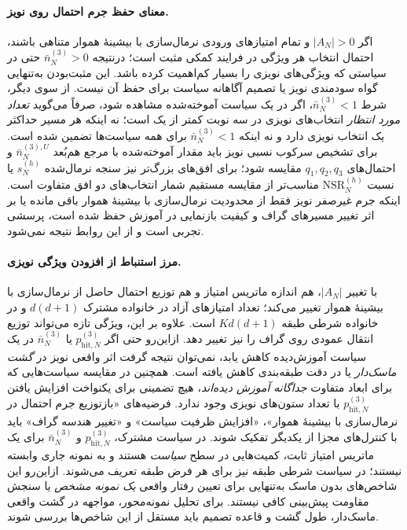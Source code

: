 \paragraph{معنای حفظ جرم احتمال روی نویز.}
اگر $|A_N|>0$ و تمام امتیازهای ورودی نرمال‌سازی با بیشینهٔ هموار متناهی باشند،
احتمال انتخاب هر ویژگی در فرایند کمکی مثبت است؛
درنتیجه $\bar n_N^{(3)}>0$ حتی در سیاستی که
ویژگی‌های نویزی را بسیار کم‌اهمیت کرده باشد.
این مثبت‌بودن به‌تنهایی گواه سودمندی نویز
یا تصمیم آگاهانه سیاست برای حفظ آن نیست.
از سوی دیگر، شرط $\bar n_N^{(3)}<1$، اگر در یک سیاست
آموخته‌شده مشاهده شود، صرفاً می‌گوید
\emph{تعداد مورد انتظار} انتخاب‌های نویزی
در سه نوبت کمتر از یک است؛
نه اینکه هر مسیر حداکثر یک انتخاب نویزی دارد
و نه اینکه $\bar n_N^{(3)}<1$ برای همه سیاست‌ها تضمین شده است.
برای تشخیص سرکوب نسبی نویز باید مقدار آموخته‌شده
با مرجع هم‌بُعد $\bar n_N^{(3),U}$ و احتمال‌های
$q_1,q_2,q_3$ مقایسه شود؛ برای افق‌های
بزرگ‌تر نیز سنجه نرمال‌شده
$s_N^{(h)}$ یا نسبت
$\mathrm{NSR}_N^{(h)}$
مناسب‌تر از مقایسه مستقیم
شمار انتخاب‌های دو افق متفاوت است.
اینکه جرم غیرصفر نویز فقط از محدودیت نرمال‌سازی با بیشینهٔ هموار
باقی مانده یا بر اثر تغییر مسیرهای گراف
و کیفیت بازنمایی در آموزش حفظ شده است،
پرسشی تجربی است و از این روابط نتیجه نمی‌شود.

\paragraph{مرز استنباط از افزودن ویژگی نویزی.}
با تغییر $|A_N|$، هم اندازه ماتریس امتیاز
و هم توزیع احتمال حاصل از نرمال‌سازی با بیشینهٔ هموار تغییر می‌کند؛
تعداد امتیازهای آزاد در خانواده مشترک $d(d+1)$
و در خانواده شرطی طبقه $Kd(d+1)$ است.
علاوه بر این، ویژگی تازه می‌تواند توزیع انتقال عمودی
روی گراف را نیز تغییر دهد. ازاین‌رو حتی اگر
$p_{\mathrm{hit},N}^{(3)}$ یا
$\bar n_N^{(3)}$ در یک سیاست آموزش‌دیده کاهش یابد،
نمی‌توان نتیجه گرفت اثر واقعی نویز در
\emph{گشت ماسک‌دار} یا در دقت طبقه‌بندی کاهش یافته است.
همچنین در مقایسه سیاست‌هایی که برای ابعاد متفاوت
\emph{جداگانه آموزش دیده‌اند}،
هیچ تضمینی برای یکنواخت افزایش یافتن
$p_{\mathrm{hit},N}^{(3)}$
با تعداد ستون‌های نویزی وجود ندارد.
فرضیه‌های «بازتوزیع جرم احتمال در نرمال‌سازی با بیشینهٔ هموار»، «افزایش ظرفیت سیاست»
و «تغییر هندسه گراف» باید با کنترل‌های مجزا
از یکدیگر تفکیک شوند.
در سیاست مشترک، $p_{\mathrm{hit},N}^{(3)}$ و
$\bar n_N^{(3)}$ برای یک ماتریس
امتیاز ثابت، کمیت‌هایی در سطح \emph{سیاست} هستند
و به نمونه جاری وابسته نیستند؛ در سیاست شرطی طبقه
نیز برای هر فرض طبقه تعریف می‌شوند.
ازاین‌رو این شاخص‌های بدون ماسک به‌تنهایی
برای تعیین رفتار واقعی \emph{یک نمونه مشخص}
یا سنجش مقاومت پیش‌بینی کافی نیستند.
برای تحلیل نمونه‌محور،
مواجهه در گشت واقعی ماسک‌دار،
طول گشت و قاعده تصمیم
باید مستقل از این شاخص‌ها بررسی شوند.


